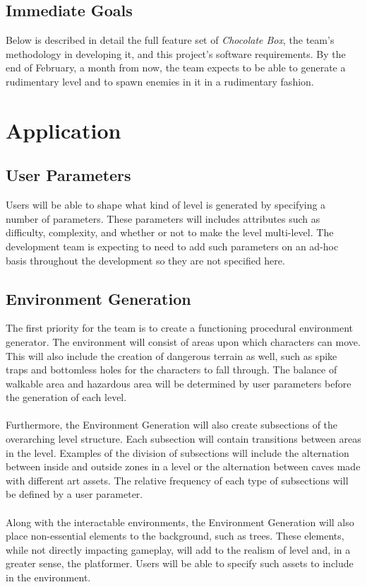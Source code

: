 \documentclass[pdftex,12pt,letter]{article}
\begin{document}
\subsection{Immediate Goals}
Below is described in detail the full feature set of \textit{Chocolate Box}, the team's methodology in developing it, and this project's software requirements. By the end of February, a month from now, the team expects to be able to generate a rudimentary level and to spawn enemies in it in a rudimentary fashion.

\section{Application}

\subsection{User Parameters}
Users will be able to shape what kind of level is generated by specifying a number of parameters. These parameters will includes attributes such as difficulty, complexity, and whether or not to make the level multi-level. The development team is expecting to need to add such parameters on an ad-hoc basis throughout the development so they are not specified here.

\subsection{Environment Generation}
The first priority for the team is to create a functioning procedural environment generator. The environment will consist of  areas upon which characters can move. This will also include the creation of dangerous terrain as well, such as spike traps and bottomless holes for the characters to fall through. The balance of walkable area and hazardous area will be determined by user parameters before the generation of each level. 
\\\\
Furthermore, the Environment Generation will also create subsections of the overarching level structure. Each subsection will contain transitions between areas in the level. Examples of the division of subsections will include the alternation between inside and outside zones in a level or the alternation between caves made with different art assets. The relative frequency of each type of subsections will be defined by a user parameter.
\\\\
Along with the interactable environments, the Environment Generation will also place non-essential elements to the background, such as trees. These elements, while not directly impacting gameplay, will add to the realism of level and, in a greater sense, the platformer. Users will be able to specify such assets to include in the environment. 
\\
\end{document}
